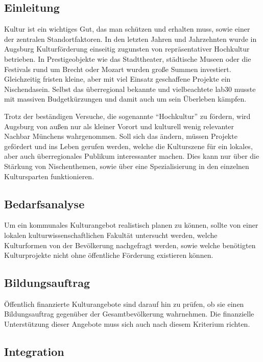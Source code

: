   \subsection{Einleitung}
  
  Kultur ist ein wichtiges Gut, das man schützen und erhalten muss, sowie 
  einer der zentralen Standortfaktoren. In den letzten Jahren und Jahrzehnten 
  wurde in Augsburg Kulturförderung einseitig zugunsten von repräsentativer 
  Hochkultur betrieben. In Prestigeobjekte wie das Stadttheater, städtische 
  Museen oder die Festivals rund um Brecht oder Mozart wurden große Summen 
  investiert. Gleichzeitig fristen kleine, aber mit viel Einsatz geschaffene 
  Projekte ein Nischendasein. Selbst das überregional bekannte und 
  vielbeachtete lab30 musste mit massiven Budgetkürzungen und damit auch um 
  sein Überleben kämpfen.
  
  Trotz der beständigen Versuche, die sogenannte "`Hochkultur"' zu fördern, 
  wird Augsburg von außen nur als kleiner Vorort und kulturell wenig 
  relevanter Nachbar Münchens wahrgenommen. Soll sich das ändern, müssen 
  Projekte gefördert und ins Leben gerufen werden, welche die Kulturszene für 
  ein lokales, aber auch überregionales Publikum interessanter machen. Dies 
  kann nur über die Stärkung von Nischenthemen, sowie über eine 
  Spezialisierung in den einzelnen Kultursparten funktionieren.
  
  \subsection{Bedarfsanalyse}
  
  Um ein kommunales Kulturangebot realistisch planen zu können, sollte von 
  einer lokalen kulturwissenschaftlichen Fakultät untersucht werden, welche 
  Kulturformen von der Bevölkerung nachgefragt werden, sowie welche benötigten 
  Kulturprojekte nicht ohne öffentliche Förderung existieren können.
  
  \subsection{Bildungsauftrag}
  
  Öffentlich finanzierte Kulturangebote sind darauf hin zu prüfen, ob sie 
  einen Bildungsauftrag gegenüber der Gesamtbevölkerung wahrnehmen. Die 
  finanzielle Unterstützung dieser Angebote muss sich auch nach diesem 
  Kriterium richten.
  
  \subsection{Integration}
  
